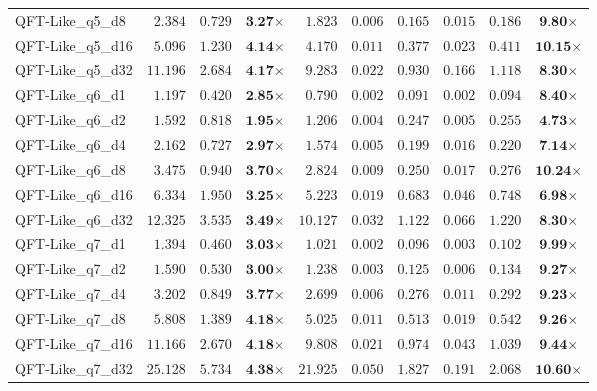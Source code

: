 \begin{table*}[t]
{\begin{tabular}{| l || r r c || r r r r r c |}
QFT-Like\_q5\_d8 & $2.384$ & $0.729$ & $\textbf{3.27}$$\times$ & $1.823$ & $0.006$ & $0.165$ & $0.015$ & $0.186$ & $\textbf{9.80}$$\times$ \\
QFT-Like\_q5\_d16 & $5.096$ & $1.230$ & $\textbf{4.14}$$\times$ & $4.170$ & $0.011$ & $0.377$ & $0.023$ & $0.411$ & $\textbf{10.15}$$\times$ \\
QFT-Like\_q5\_d32 & $11.196$ & $2.684$ & $\textbf{4.17}$$\times$ & $9.283$ & $0.022$ & $0.930$ & $0.166$ & $1.118$ & $\textbf{8.30}$$\times$ \\
QFT-Like\_q6\_d1 & $1.197$ & $0.420$ & $\textbf{2.85}$$\times$ & $0.790$ & $0.002$ & $0.091$ & $0.002$ & $0.094$ & $\textbf{8.40}$$\times$ \\
QFT-Like\_q6\_d2 & $1.592$ & $0.818$ & $\textbf{1.95}$$\times$ & $1.206$ & $0.004$ & $0.247$ & $0.005$ & $0.255$ & $\textbf{4.73}$$\times$ \\
QFT-Like\_q6\_d4 & $2.162$ & $0.727$ & $\textbf{2.97}$$\times$ & $1.574$ & $0.005$ & $0.199$ & $0.016$ & $0.220$ & $\textbf{7.14}$$\times$ \\
QFT-Like\_q6\_d8 & $3.475$ & $0.940$ & $\textbf{3.70}$$\times$ & $2.824$ & $0.009$ & $0.250$ & $0.017$ & $0.276$ & $\textbf{10.24}$$\times$ \\
QFT-Like\_q6\_d16 & $6.334$ & $1.950$ & $\textbf{3.25}$$\times$ & $5.223$ & $0.019$ & $0.683$ & $0.046$ & $0.748$ & $\textbf{6.98}$$\times$ \\
QFT-Like\_q6\_d32 & $12.325$ & $3.535$ & $\textbf{3.49}$$\times$ & $10.127$ & $0.032$ & $1.122$ & $0.066$ & $1.220$ & $\textbf{8.30}$$\times$ \\
QFT-Like\_q7\_d1 & $1.394$ & $0.460$ & $\textbf{3.03}$$\times$ & $1.021$ & $0.002$ & $0.096$ & $0.003$ & $0.102$ & $\textbf{9.99}$$\times$ \\
QFT-Like\_q7\_d2 & $1.590$ & $0.530$ & $\textbf{3.00}$$\times$ & $1.238$ & $0.003$ & $0.125$ & $0.006$ & $0.134$ & $\textbf{9.27}$$\times$ \\
QFT-Like\_q7\_d4 & $3.202$ & $0.849$ & $\textbf{3.77}$$\times$ & $2.699$ & $0.006$ & $0.276$ & $0.011$ & $0.292$ & $\textbf{9.23}$$\times$ \\
QFT-Like\_q7\_d8 & $5.808$ & $1.389$ & $\textbf{4.18}$$\times$ & $5.025$ & $0.011$ & $0.513$ & $0.019$ & $0.542$ & $\textbf{9.26}$$\times$ \\
QFT-Like\_q7\_d16 & $11.166$ & $2.670$ & $\textbf{4.18}$$\times$ & $9.808$ & $0.021$ & $0.974$ & $0.043$ & $1.039$ & $\textbf{9.44}$$\times$ \\
QFT-Like\_q7\_d32 & $25.128$ & $5.734$ & $\textbf{4.38}$$\times$ & $21.925$ & $0.050$ & $1.827$ & $0.191$ & $2.068$ & $\textbf{10.60}$$\times$ \\
\hline
\end{tabular}
}
\end{table*}
